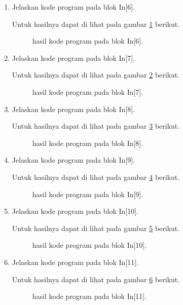 \begin{enumerate}
\item Jelaskan kode program pada blok  In[6].

Untuk hasilnya dapat di lihat pada gambar \ref{c146} berikut.
\begin{figure}[!htbp]
      \caption{hasil kode program pada blok  In[6].}
      \label{c146}
      \end{figure}

\item Jelaskan kode program pada blok  In[7].

Untuk hasilnya dapat di lihat pada gambar \ref{c147} berikut.
\begin{figure}[!htbp]
      \caption{hasil kode program pada blok  In[7].}
      \label{c147}
      \end{figure}

\item Jelaskan kode program pada blok  In[8].

Untuk hasilnya dapat di lihat pada gambar \ref{c148} berikut.
\begin{figure}[!htbp]
      \caption{hasil kode program pada blok  In[8].}
      \label{c148}
      \end{figure}

\item Jelaskan kode program pada blok  In[9].

Untuk hasilnya dapat di lihat pada gambar \ref{c149} berikut.
\begin{figure}[!htbp]
      \caption{hasil kode program pada blok  In[9].}
      \label{c149}
      \end{figure}

\item Jelaskan kode program pada blok  In[10].

Untuk hasilnya dapat di lihat pada gambar \ref{c150} berikut.
\begin{figure}[!htbp]
      \caption{hasil kode program pada blok  In[10].}
      \label{c150}
      \end{figure}

\item Jelaskan kode program pada blok  In[11].

Untuk hasilnya dapat di lihat pada gambar \ref{c151} berikut.
\begin{figure}[!htbp]
      \caption{hasil kode program pada blok  In[11].}
      \label{c151}
      \end{figure}


\end{enumerate}
